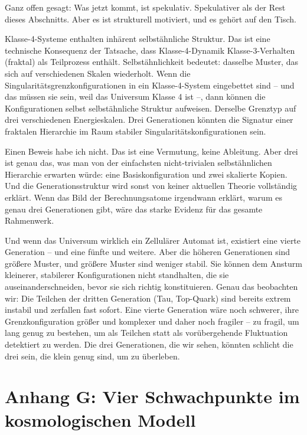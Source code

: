 \documentclass[11pt, twoside, openright]{book}
\begin{document}
Ganz offen gesagt: Was jetzt kommt, ist spekulativ. Spekulativer als der Rest dieses Abschnitts. Aber es ist strukturell motiviert, und es gehört auf den Tisch.

Klasse-4-Systeme enthalten inhärent selbstähnliche Struktur. Das ist eine technische Konsequenz der Tatsache, dass Klasse-4-Dynamik Klasse-3-Verhalten (fraktal) als Teilprozess enthält. Selbstähnlichkeit bedeutet: dasselbe Muster, das sich auf verschiedenen Skalen wiederholt. Wenn die Singularitätsgrenzkonfigurationen in ein Klasse-4-System eingebettet sind -- und das müssen sie sein, weil das Universum Klasse 4 ist --, dann können die Konfigurationen selbst selbstähnliche Struktur aufweisen. Derselbe Grenztyp auf drei verschiedenen Energieskalen. Drei Generationen könnten die Signatur einer fraktalen Hierarchie im Raum stabiler Singularitätskonfigurationen sein.

Einen Beweis habe ich nicht. Das ist eine Vermutung, keine Ableitung. Aber drei ist genau das, was man von der einfachsten nicht-trivialen selbstähnlichen Hierarchie erwarten würde: eine Basiskonfiguration und zwei skalierte Kopien. Und die Generationsstruktur wird sonst von keiner aktuellen Theorie vollständig erklärt. Wenn das Bild der Berechnungsatome irgendwann erklärt, warum es genau drei Generationen gibt, wäre das starke Evidenz für das gesamte Rahmenwerk.

Und wenn das Universum wirklich ein Zellulärer Automat ist, existiert eine vierte Generation -- und eine fünfte und weitere. Aber die höheren Generationen sind größere Muster, und größere Muster sind weniger stabil. Sie können dem Ansturm kleinerer, stabilerer Konfigurationen nicht standhalten, die sie auseinanderschneiden, bevor sie sich richtig konstituieren. Genau das beobachten wir: Die Teilchen der dritten Generation (Tau, Top-Quark) sind bereits extrem instabil und zerfallen fast sofort. Eine vierte Generation wäre noch schwerer, ihre Grenzkonfiguration größer und komplexer und daher noch fragiler -- zu fragil, um lang genug zu bestehen, um als Teilchen statt als vorübergehende Fluktuation detektiert zu werden. Die drei Generationen, die wir sehen, könnten schlicht die drei sein, die klein genug sind, um zu überleben.


\chapter*{Anhang G: Vier Schwachpunkte im kosmologischen Modell}
\end{document}
